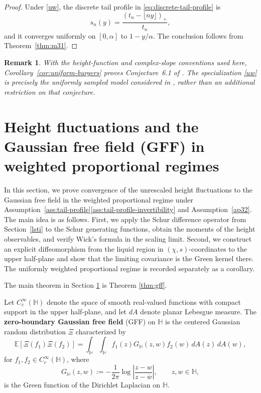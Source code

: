 \documentclass[11pt]{amsart}
\theoremstyle{plain}
\newtheorem{remark}[theorem]{Remark}
\numberwithin{equation}{section}
\numberwithin{theorem}{section}
\numberwithin{figure}{section}
\begin{document}
\begin{proof}
Under \eqref{uw}, the discrete tail profile in
\eqref{eq:discrete-tail-profile} is
\[
    s_n(y)
    =
    \frac{(t_n-\lfloor ny\rfloor)_+}{t_n},
\]
and it converges uniformly on $[0,\alpha]$ to
$1-y/\alpha$. The conclusion follows from
Theorem~\ref{thm:m31}.
\end{proof}

\begin{remark}
With the height-function and complex-slope conventions used here,
Corollary~\ref{cor:uniform-burgers} proves Conjecture~6.1 of
\cite{SKN21}. The specialization \eqref{uw} is precisely the uniformly
sampled model considered in \cite{SKN21}, rather than an additional
restriction on that conjecture.
\end{remark}

\section{Height fluctuations and the Gaussian free field (GFF) in weighted proportional regimes}\label{gff}

In this section, we prove convergence of the unrescaled height
fluctuations to the Gaussian free field in the weighted proportional
regime under Assumption~\ref{ass:tail-profile}\ref{ass:tail-profile-invertibility} and Assumption~\ref{ap32}. The
main idea is as follows. First, we apply the Schur difference operator
from Section~\ref{lsti} to the Schur generating functions, obtain the
moments of the height observables, and verify Wick's formula in the
scaling limit. Second, we construct an explicit diffeomorphism from the
liquid region in $(\chi,s)$-coordinates to the upper half-plane and
show that the limiting covariance is the Green kernel there. The
uniformly weighted proportional regime is recorded separately as a
corollary.

The main theorem in Section \ref{gff} is Theorem \ref{thm:gff}.

Let $C_c^{\infty}(\mathbb H)$ denote the space of smooth real-valued
functions with compact support in the upper half-plane, and let $dA$ denote
planar Lebesgue measure. The \textbf{zero-boundary Gaussian free field}
(GFF) on $\mathbb H$ is the centered Gaussian random distribution $\Xi$
characterized by
\begin{equation}
    \mathbb E[\Xi(f_1)\Xi(f_2)]
    =
    \int_{\mathbb H}\int_{\mathbb H}
    f_1(z)G_{\mathbb H}(z,w)f_2(w)\,dA(z)\,dA(w),
    \label{eq:gff-covariance}
\end{equation}
for $f_1,f_2\in C_c^{\infty}(\mathbb H)$, where
\begin{equation}
    G_{\mathbb H}(z,w)
    :=
    -\frac{1}{2\pi}
    \log\left|\frac{z-w}{z-\overline w}\right|,
    \qquad z,w\in\mathbb H,
    \label{eq:green-H}
\end{equation}
is the Green function of the Dirichlet Laplacian on $\mathbb H$.
\end{document}
